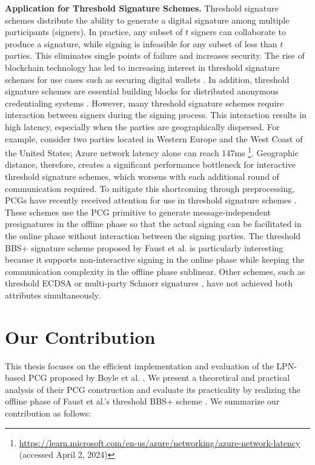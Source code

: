 \textbf{Application for Threshold Signature Schemes.}  Threshold signature schemes \cite{desmedt1987society, desmedt1992threshold} distribute the ability to generate a digital signature among multiple participants (signers). In practice, any subset of $t$ signers can collaborate to produce a signature, while signing is infeasible for any subset of less than $t$ parties. This eliminates single points of failure and increases security. The rise of blockchain technology has led to increasing interest in threshold signature schemes for use cases such as securing digital wallets \cite{gennaro2016threshold}. In addition, threshold signature schemes are essential building blocks for distributed anonymous credentialing systems \cite{garman2013decentralized}. However, many threshold signature schemes require interaction between signers during the signing process. This interaction results in high latency, especially when the parties are geographically dispersed. For example, consider two parties located in Western Europe and the West Coast of the United States; Azure network latency alone can reach 147ms \footnote{\url{https://learn.microsoft.com/en-us/azure/networking/azure-network-latency} (accessed April 2, 2024)}. Geographic distance, therefore, creates a significant performance bottleneck for interactive threshold signature schemes, which worsens with each additional round of communication required. To mitigate this shortcoming through preprocessing, PCGs have recently received attention for use in threshold signature schemes \cite{abram2022low, faust2023non}. These schemes use the PCG primitive to generate message-independent presignatures in the offline phase so that the actual signing can be facilitated in the online phase without interaction between the signing parties. The threshold BBS+ signature scheme proposed by Faust et al. \cite{faust2023non} is particularly interesting because it supports non-interactive signing in the online phase while keeping the communication complexity in the offline phase sublinear. Other schemes, such as threshold ECDSA \cite{abram2022low} or multi-party Schnorr signatures \cite{kondi2023two}, have not achieved both attributes simultaneously. 

\section{Our Contribution}
This thesis focuses on the efficient implementation and evaluation of the LPN-based PCG proposed by Boyle et al. \cite{boyle2020efficient}. We present a theoretical and practical analysis of their PCG construction and evaluate its practicality by realizing the offline phase of Faust et al.'s threshold BBS+ scheme \cite{faust2023non}. We summarize our contribution as follows:

